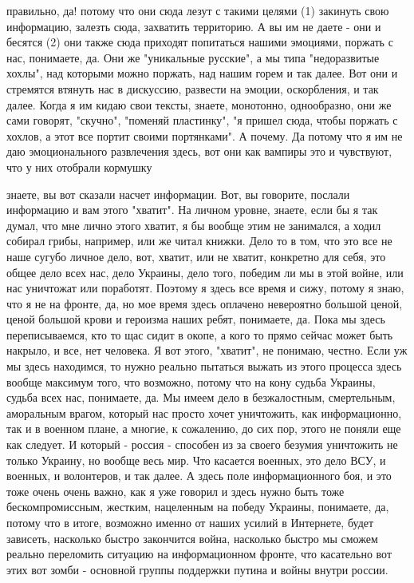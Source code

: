 правильно, да! потому что они сюда лезут с такими целями (1) закинуть свою
информацию, залезть сюда, захватить территорию. А вы им не даете - они и
бесятся (2) они также сюда приходят попитаться нашими эмоциями, поржать с нас,
понимаете, да. Они же "уникальные русские",  а мы типа "недоразвитые хохлы",
над которыми можно поржать, над нашим горем и так далее. Вот они и стремятся
втянуть нас в дискуссию, развести на эмоции, оскорбления, и так далее. Когда я
им кидаю свои тексты, знаете, монотонно, однообразно, они же сами говорят,
"скучно", "поменяй пластинку", "я пришел сюда, чтобы поржать с хохлов, а этот
все портит своими портянками". А почему. Да потому что я им не даю
эмоционального развлечения здесь, вот они как вампиры это и чувствуют, что у
них отобрали кормушку


знаете, вы вот сказали насчет информации. Вот, вы говорите, послали информацию
и вам этого "хватит". На личном уровне, знаете, если бы я так думал, что мне
лично этого хватит, я бы вообще этим не занимался, а ходил собирал грибы,
например, или же читал книжки. Дело то в том, что это все не наше сугубо личное
дело, вот, хватит, или не хватит, конкретно для себя, это общее дело всех нас,
дело Украины, дело того, победим ли мы в этой войне, или нас уничтожат или
поработят. Поэтому я здесь все время и сижу, потому я знаю, что я не на фронте,
да, но мое время здесь оплачено невероятно большой ценой, ценой большой крови и
героизма наших ребят, понимаете, да. Пока мы здесь переписываемся, кто то щас
сидит в окопе, а кого то прямо сейчас может быть накрыло, и все, нет человека.
Я вот этого, "хватит", не понимаю, честно. Если уж мы здесь находимся, то нужно
реально пытаться выжать из этого процесса здесь вообще максимум того, что
возможно, потому что на кону судьба Украины, судьба всех нас, понимаете, да. Мы
имеем дело в безжалостным, смертельным, аморальным врагом, который нас просто
хочет уничтожить, как информационно, так и в военном плане, а многие, к
сожалению, до сих пор, этого не поняли еще как следует. И который - россия -
способен из за своего безумия уничтожить не только Украину, но вообще весь мир.
Что касается военных, это дело ВСУ, и военных, и волонтеров, и так далее. А
здесь поле информационного боя, и это тоже очень очень важно, как я уже говорил
и здесь нужно быть тоже бескомпромиссным, жестким, нацеленным на победу
Украины, понимаете, да, потому что в итоге, возможно именно от наших усилий в
Интернете, будет зависеть, насколько быстро закончится война, насколько быстро
мы сможем реально переломить ситуацию на информационном фронте, что касательно
вот этих вот зомби - основной группы поддержки путина и войны внутри россии.

